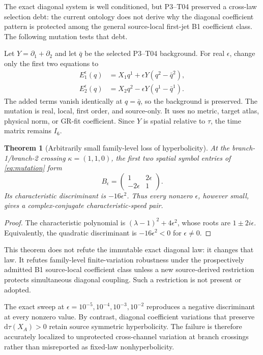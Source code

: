 \documentclass[11pt]{article}
\newcommand{\dd}{\mathrm d}
\newtheorem{theorem}{Theorem}
\begin{document}
The exact diagonal system is well conditioned, but P3--T04 preserved a
cross-law selection debt: the current ontology does not derive why the
diagonal coefficient pattern is protected among the general source-local
first-jet B1 coefficient class.  The following mutation tests that debt.

Let $Y=\partial_1+\partial_2$ and let $\bar q$ be the selected P3--T04
background.  For real $\epsilon$, change only the first two equations to
\begin{align}
 E_1^\epsilon(q)&=X_1q^1+\epsilon Y(q^2-\bar q^2),\nonumber\\
 E_2^\epsilon(q)&=X_2q^2-\epsilon Y(q^1-\bar q^1).
 \label{eq:mutation}
\end{align}
The added terms vanish identically at $q=\bar q$, so the background is
preserved.  The mutation is real, local, first order, and source-only.  It
uses no metric, target atlas, physical norm, or GR-fit coefficient.  Since $Y$
is spatial relative to $\tau$, the time matrix remains $I_6$.

\begin{theorem}[Arbitrarily small family-level loss of hyperbolicity]
At the branch-1/branch-2 crossing $\kappa=(1,1,0)$, the first two spatial
symbol entries of \eqref{eq:mutation} form
\begin{equation}
 B_\epsilon=
 \begin{pmatrix}1&2\epsilon\\-2\epsilon&1\end{pmatrix}.
 \label{eq:block}
\end{equation}
Its characteristic discriminant is $-16\epsilon^2$.  Thus every nonzero
$\epsilon$, however small, gives a complex-conjugate characteristic-speed
pair.
\end{theorem}

\begin{proof}
The characteristic polynomial is
$(\lambda-1)^2+4\epsilon^2$, whose roots are
$1\pm2i\epsilon$.  Equivalently, the quadratic discriminant is
$-16\epsilon^2<0$ for $\epsilon\ne0$.
\end{proof}

This theorem does not refute the immutable exact diagonal law: it changes that
law.  It refutes family-level finite-variation robustness under the
prospectively admitted B1 source-local coefficient class unless a new
source-derived restriction protects simultaneous diagonal coupling.  Such a
restriction is not present or adopted.

The exact sweep at
$\epsilon=10^{-5},10^{-4},10^{-3},10^{-2}$ reproduces a negative discriminant
at every nonzero value.  By contrast, diagonal coefficient variations that
preserve $\dd\tau(X_A)>0$ retain source symmetric hyperbolicity.  The failure
is therefore accurately localized to unprotected cross-channel variation at
branch crossings rather than misreported as fixed-law nonhyperbolicity.
\end{document}
